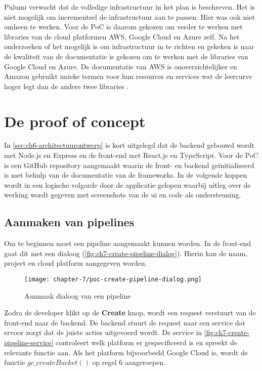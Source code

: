 Pulumi verwacht dat de volledige infrastructuur in het plan is beschreven. Het is niet mogelijk om incrementeel de infrastructuur aan te passen. Hier was ook niet omheen te werken. Voor de PoC is daarom gekozen om verder te werken met libraries van de cloud platformen AWS, Google Cloud en Azure zelf. Na het onderzoeken of het mogelijk is om infrastructuur in te richten en gekeken is naar de kwaliteit van de documentatie is gekozen om te werken met de libraries van Google Cloud en Azure. De documentatie van AWS is onoverzichtelijker en Amazon gebruikt unieke termen voor hun resources en services wat de leercurve hoger legt dan de andere twee libraries \cite{aws-sdk-javascript-docs}.

\section{De proof of concept}\label{sec:ch7-de-proof-of-concept}
In \autoref{sec:ch6-architectuurontwerp} is kort uitgelegd dat de backend gebouwd wordt met Node.js en Express en de front-end met React.js en TypeScript. Voor de PoC is een GitHub repository aangemaakt waarin de front- en backend geïnitialiseerd is met behulp van de documentatie van de frameworks. In de volgende koppen wordt in een logische volgorde door de applicatie gelopen waarbij uitleg over de werking wordt gegeven met screenshots van de \acrshort{ui} en code als ondersteuning.

\subsection{Aanmaken van pipelines}\label{subsec:ch7-aanmaken-van-pipelines}
Om te beginnen moet een pipeline aangemaakt kunnen worden. In de front-end gaat dit met een dialoog (\autoref{fig:ch7-create-pipeline-dialog}). Hierin kan de naam, project en cloud platform aangegeven worden.

\begin{figure}[hbt!]
  \centering
  \texttt{[image: chapter-7/poc-create-pipeline-dialog.png]}
  \caption{Aanmaak dialoog van een pipeline}
  \label{fig:ch7-create-pipeline-dialog}
\end{figure}

Zodra de developer klikt op de \textbf{Create} knop, wordt een request verstuurt van de front-end naar de backend. De backend stuurt de request naar een service dat ervoor zorgt dat de juiste acties uitgevoerd wordt. De service in \autoref{fig:ch7-create-pipeline-service} controleert welk platform er gespecificeerd is en spreekt de relevante functie aan. Als het platform bijvoorbeeld Google Cloud is, wordt de functie \(gc\_createBucket()\) op regel 6 aangeroepen.

